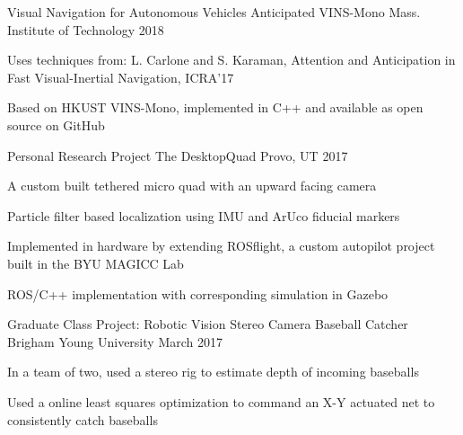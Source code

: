 

\begin{cventries}

  \cventry
    {Visual Navigation for Autonomous Vehicles} %
    {Anticipated VINS-Mono} %
    {Mass. Institute of Technology} %
    {2018} %
    {
      \begin{cvitems} %
      \item {Uses techniques from: L. Carlone and S. Karaman, Attention and Anticipation in Fast Visual-Inertial Navigation, ICRA'17}
      \item {Based on HKUST VINS-Mono, implemented in C++ and available as open source on GitHub}
      \end{cvitems}
    }

  \cventry
    {Personal Research Project} %
    {The DesktopQuad} %
    {Provo, UT} %
    {2017} %
    {
      \begin{cvitems} %
      \item {A custom built tethered micro quad with an upward facing camera}
      \item {Particle filter based localization using IMU and ArUco fiducial markers}
      \item {Implemented in hardware by extending ROSflight, a custom autopilot project built in the BYU MAGICC Lab}
      \item {ROS/C++ implementation with corresponding simulation in Gazebo}
      \end{cvitems}
    }

  \cventry
    {Graduate Class Project: Robotic Vision} %
    {Stereo Camera Baseball Catcher} %
    {Brigham Young University} %
    {March 2017} %
    {
      \begin{cvitems} %
      \item {In a team of two, used a stereo rig to estimate depth of incoming baseballs}
      \item {Used a online least squares optimization to command an X-Y actuated net to consistently catch baseballs }
      \end{cvitems}
    }


\end{cventries}
